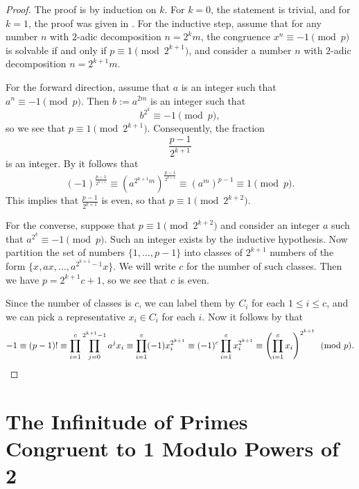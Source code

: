 \begin{proof}
  The proof is by induction on $k$. For $k=0$, the statement is trivial, and for $k=1$, the proof was given in . For the inductive step, assume that for any number $n$ with $2$-adic decomposition $n=2^km$, the congruence $x^n\equiv-1\pmod{p}$ is solvable if and only if $p\equiv 1\pmod{2^{k+1}}$, and consider a number $n$ with $2$-adic decomposition $n=2^{k+1}m$.

  For the forward direction, assume that $a$ is an integer such that $a^n\equiv -1\pmod{p}$. Then $b:=a^{2m}$ is an integer such that
  \begin{equation*}
    b^{2^k}\equiv -1\pmod{p},
  \end{equation*}
  so we see that $p\equiv 1\pmod{2^{k+1}}$. Consequently, the fraction
  \begin{equation*}
    \frac{p-1}{2^{k+1}}
  \end{equation*}
  is an integer. By  it follows that
  \begin{equation*}
    (-1)^{\frac{p-1}{2^{k+1}}}\equiv(a^{2^{k+1}m})^{\frac{p-1}{2^{k+1}}}\equiv (a^m)^{p-1}\equiv 1\pmod{p}.
  \end{equation*}
  This implies that $\frac{p-1}{2^{k+1}}$ is even, so that $p\equiv 1\pmod{2^{k+2}}$.

  For the converse, suppose that $p\equiv 1\pmod{2^{k+2}}$ and consider an integer $a$ such that $a^{2^k}\equiv -1\pmod{p}$. Such an integer exists by the inductive hypothesis. Now partition the set of numbers $\{1,\ldots,p-1\}$ into classes of $2^{k+1}$ numbers of the form $\{x,ax,\ldots,a^{2^{k+1}-1}x\}$. We will write $c$ for the number of such classes. Then we have $p=2^{k+1}c+1$, so we see that $c$ is even.

  Since the number of classes is $c$, we can label them by $C_i$ for each $1\leq i\leq c$, and we can pick a representative $x_i\in C_i$ for each $i$. Now it follows by  that
  \begin{equation*}
    -1\equiv (p-1)!\equiv \prod_{i=1}^c \prod_{j=0}^{2^{k+1}-1} a^jx_i \equiv \prod_{i=1}^c (-1)x_i^{2^{k+1}} \equiv (-1)^c\prod_{i=1}^c x_i^{2^{k+1}} \equiv \left(\prod_{i=1}^c x_i\right)^{2^{k+1}}\pmod{p}.\qedhere
  \end{equation*}
\end{proof}

\section{The Infinitude of Primes Congruent to 1 Modulo Powers of 2}

